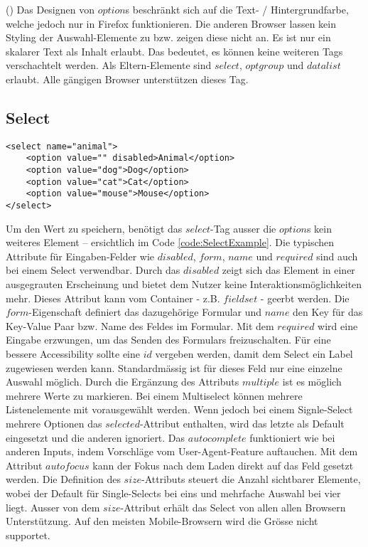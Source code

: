 (\cite{optionMdn}) Das Designen von $option$s beschränkt sich auf die Text- / Hintergrundfarbe, welche jedoch nur in Firefox funktionieren. 
Die anderen Browser lassen kein Styling der Auswahl-Elemente zu bzw. zeigen diese nicht an.
Es ist nur ein skalarer Text als Inhalt erlaubt. 
Das bedeutet, es können keine weiteren Tags verschachtelt werden.
Als Eltern-Elemente sind $select$, $optgroup$ und $datalist$ erlaubt.
Alle gängigen Browser unterstützen dieses Tag.



\subsection{Select}

\begin{lstlisting}[style = htmlcssjs, caption = Select Example, label = code:SelectExample]
<select name="animal">
    <option value="" disabled>Animal</option>
    <option value="dog">Dog</option>
    <option value="cat">Cat</option>
    <option value="mouse">Mouse</option>
</select>
\end{lstlisting}

Um den Wert zu speichern, benötigt das $select$-Tag ausser die $option$s kein weiteres Element – ersichtlich im Code \ref{code:SelectExample}.
Die typischen Attribute für Eingaben-Felder wie $disabled$, $form$, $name$ und $required$ sind auch bei einem Select verwendbar.
Durch das $disabled$ zeigt sich das Element in einer ausgegrauten Erscheinung und bietet dem Nutzer keine Interaktionsmöglichkeiten mehr.
Dieses Attribut kann vom Container - z.B. $fieldset$ - geerbt werden.
Die $form$-Eigenschaft definiert das dazugehörige Formular und $name$ den Key für das Key-Value Paar bzw. Name des Feldes im Formular. 
Mit dem $required$ wird eine Eingabe erzwungen, um das Senden des Formulars freizuschalten.
Für eine bessere Accessibility sollte eine $id$ vergeben werden, damit dem Select ein Label zugewiesen werden kann.
Standardmässig ist für dieses Feld nur eine einzelne Auswahl möglich.
Durch die Ergänzung des Attributs $multiple$ ist es möglich mehrere Werte zu markieren.
Bei einem Multiselect können mehrere Listenelemente mit vorausgewählt werden. %
Wenn jedoch bei einem Signle-Select mehrere Optionen das $selected$-Attribut enthalten, wird das letzte als Default eingesetzt und die anderen ignoriert.
Das $autocomplete$ funktioniert wie bei anderen Inputs, indem Vorschläge vom User-Agent-Feature auftauchen.
Mit dem Attribut $autofocus$ kann der Fokus nach dem Laden direkt auf das Feld gesetzt werden.
Die Definition des $size$-Attributs steuert die Anzahl sichtbarer Elemente, wobei der Default für Single-Selects bei eins und mehrfache Auswahl bei vier liegt.
Ausser von dem $size$-Attribut erhält das Select von allen allen Browsern Unterstützung.
Auf den meisten Mobile-Browsern wird die Grösse nicht supportet.

